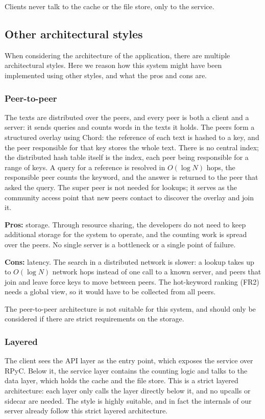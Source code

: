 \documentclass[conference,onecolumn]{IEEEtran}
\begin{document}
Clients never talk to the cache or the file store, only to the service.

\subsection{Other architectural styles}

When considering the architecture of the application, there are multiple architectural styles. Here we reason how this system might have been implemented using other styles, and what the pros and cons are.

\subsubsection{Peer-to-peer}
The texts are distributed over the peers, and every peer is both a client and a server: it sends queries and counts words in the texts it holds. The peers form a structured overlay using Chord: the reference of each text is hashed to a key, and the peer responsible for that key stores the whole text. There is no central index; the distributed hash table itself is the index, each peer being responsible for a range of keys. A query for a reference is resolved in $O(\log N)$ hops, the responsible peer counts the keyword, and the answer is returned to the peer that asked the query. The super peer is not needed for lookups; it serves as the community access point that new peers contact to discover the overlay and join it.

\noindent\textbf{Pros:} storage. Through resource sharing, the developers do not need to keep additional storage for the system to operate, and the counting work is spread over the peers. No single server is a bottleneck or a single point of failure.

\noindent\textbf{Cons:} latency. The search in a distributed network is slower: a lookup takes up to $O(\log N)$ network hops instead of one call to a known server, and peers that join and leave force keys to move between peers. The hot-keyword ranking (FR2) needs a global view, so it would have to be collected from all peers.

The peer-to-peer architecture is not suitable for this system, and should only be considered if there are strict requirements on the storage.

\subsubsection{Layered}
The client sees the API layer as the entry point, which exposes the service over RPyC. Below it, the service layer contains the counting logic and talks to the data layer, which holds the cache and the file store. This is a strict layered architecture: each layer only calls the layer directly below it, and no upcalls or sidecar are needed. The style is highly suitable, and in fact the internals of our server already follow this strict layered architecture.
\end{document}
